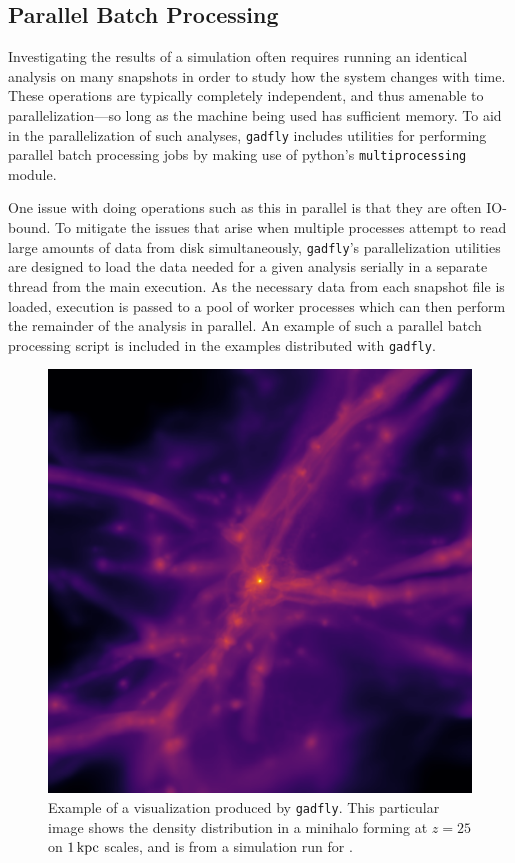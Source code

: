 \documentclass{emulateapj}
\newcommand{\code}[1]{\texttt{#1}}
\begin{document}
\subsection{Parallel Batch Processing}
\label{sec:parallel}
Investigating the results of a simulation often requires running an identical analysis on many snapshots in order to study how the system changes with time.  
These operations are typically completely independent, and thus amenable to parallelization---so long as the machine being used has sufficient memory.
To aid in the parallelization of such analyses, \code{gadfly} includes utilities for performing parallel batch processing jobs by making use of python's \code{multiprocessing} module. 

One issue with doing operations such as this in parallel is that they are often IO-bound.
To mitigate the issues that arise when multiple processes attempt to read large amounts of data from disk simultaneously, \code{gadfly}'s parallelization utilities are designed to load the data needed for a given analysis serially in a separate thread from the main execution. 
As the necessary data from each snapshot file is loaded, execution is passed to a pool of worker processes which can then perform the remainder of the analysis in parallel.  An example of such a parallel batch processing script is included in the examples distributed with \code{gadfly}.

\begin{figure}[h!]
\begin{center}
\includegraphics[width=1\columnwidth]{figures/structure_halo/structure_halo}
\caption{\label{fig:vis}
Example of a visualization produced by \code{gadfly}.  This particular image shows the density distribution in a minihalo forming at $z=25$ on $1\,{\rm kpc}$ scales, and is from a simulation run for \citet{Hummeletal2015}.%
}
\end{center}
\end{figure}
\end{document}
